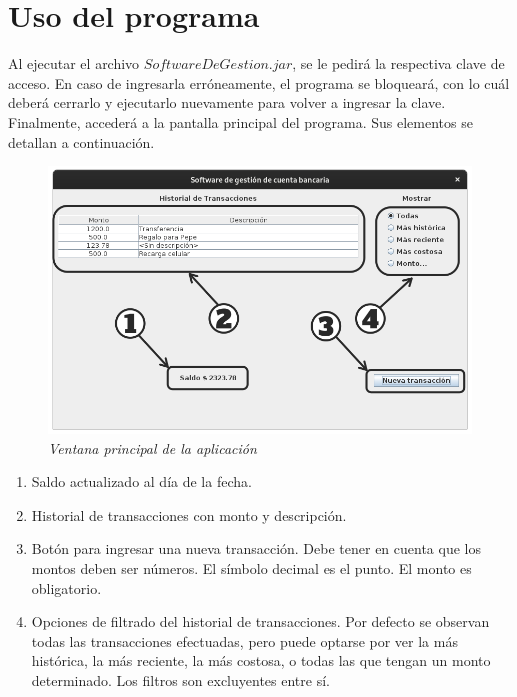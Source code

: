 \documentclass[11pt]{article}
\begin{document}
\section{Uso del programa}
Al ejecutar el archivo \(SoftwareDeGestion.jar\), se le pedirá la respectiva clave de acceso. En caso de ingresarla erróneamente, el programa se bloqueará, con lo cuál deberá cerrarlo y ejecutarlo nuevamente para volver a ingresar la clave. Finalmente, accederá a la pantalla principal del programa. Sus elementos se detallan a continuación.
\begin{figure}[htp]
\centering
\includegraphics[scale=0.75]{programa.png}
\caption*{\emph{Ventana principal de la aplicación}}
\label{}
\end{figure}
\begin{enumerate}
	\item Saldo actualizado al día de la fecha.
	\item Historial de transacciones con monto y descripción.
	\item Botón para ingresar una nueva transacción. Debe tener en cuenta que los montos deben ser números. El símbolo decimal es el punto. El monto es obligatorio.
	\item Opciones de filtrado del historial de transacciones. Por defecto se observan todas las transacciones efectuadas, pero puede optarse por ver la más histórica, la más reciente, la más costosa, o todas las que tengan un monto determinado. Los filtros son excluyentes entre sí.
\end{enumerate}
\end{document}
